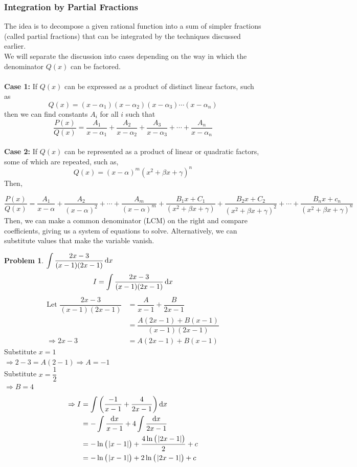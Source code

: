 \documentclass[14]{article}
\theoremstyle{definition}
\newtheorem{prob}{Problem}
\theoremstyle{case}
\begin{document}
\subsubsection{Integration by Partial Fractions}
The idea is to decompose a given rational function into a sum of simpler fractions (called partial fractions) that can be integrated by the techniques discussed earlier.\\
We will separate the discussion into cases depending on the way in which the denominator $Q(x)$ can be factored.\\\\
\textbf{Case 1:} If $Q(x)$ can be expressed as a product of distinct linear factors, such as
\[Q(x) = (x - \alpha_1)(x-\alpha_2)(x-\alpha_3)\cdots (x-\alpha_n)\] then we can find constants $A_i$ for all $i$ such that
\[\dfrac{P(x)}{Q(x)} = \dfrac{A_1}{x-\alpha_1} + \dfrac{A_2}{x-\alpha_2} + \dfrac{A_3}{x-\alpha_3} + \cdots + \dfrac{A_n}{x-\alpha_n}\]\\
\textbf{Case 2:} If $Q(x)$ can be represented as a product of linear or quadratic factors, some of which are repeated, such as,
\[Q(x) = (x-\alpha)^m \left( x^2 + \beta x + \gamma\right)^n\]
Then,

\[\dfrac{P(x)}{Q(x)} = \dfrac{A_1}{x - \alpha} +\dfrac{A_2}{(x- \alpha)^2} + \cdots + \dfrac{A_m}{(x-\alpha)^m} + \dfrac{B_1 x + C_1}{\left( x^2 + \beta x + \gamma\right)} + \dfrac{B_2 x + C_2}{\left( x^2 + \beta x + \gamma\right)^2} + \cdots + \dfrac{B_n x + c_n}{\left( x^2 + \beta x + \gamma\right)^n}\]
Then, we can make a common denominator (LCM) on the right and compare coefficients, giving us a system of equations to solve. Alternatively, we can substitute values that make the variable vanish.
\pagebreak
\begin{prob}
$\displaystyle \int \dfrac{2x-3}{(x-1)(2x-1)} \dif x$
\[I = \int \dfrac{2x-3}{(x-1)(2x-1)} \dif x\]
\begin{align*}
\text{Let } \dfrac{2x-3}{(x-1)(2x-1)} &= \dfrac{A}{x-1} + \dfrac{B}{2x-1}\\
&=\dfrac{A(2x-1) + B(x-1)}{(x-1)(2x-1)}\\
\Rightarrow 2x-3 &= A(2x-1) + B(x-1)
\end{align*}
Substitute $x=1$\\
$\Rightarrow 2-3 = A(2-1) \Rightarrow A = -1$\\
Substitute $x = \dfrac12$\\
$\Rightarrow B = 4$
\begin{align*}
\Rightarrow I &= \int \left( \dfrac{-1}{x-1} + \dfrac4{2x-1} \right) \dif x\\
&= -\int \dfrac{\dif x}{x-1} + 4\int \dfrac{\dif x}{2x-1}\\
&= -\ln\left(\; \abs{x-1} \right) + \dfrac{4 \ln \left(\; \abs{2x-1} \right)}{2}+c\\
&= -\ln\left(\; \abs{x-1} \right) + 2 \ln \left(\; \abs{2x-1} \right)+c
\end{align*}
\end{prob}
\pagebreak
\end{document}
